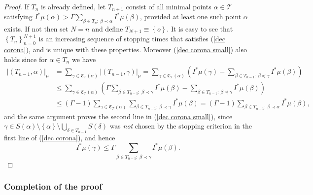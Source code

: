 \documentclass{amsart}%
\theoremstyle{plain}
\numberwithin{equation}{section}
\begin{document}
\begin{proof}
If $T_{n}$ is already defined, let $T_{n+1}$ consist of all minimal points
$\alpha\in\mathcal{T}$ satisfying $I^{\ast}\mu\left(  \alpha\right)
>\Gamma\sum_{\beta\in T_{n}:\ \beta\prec\alpha}I^{\ast}\mu\left(
\beta\right)  $, provided at least one such point $\alpha$ exists. If not then
set $N=n$ and define $T_{N+1}\equiv\left\{  o\right\}  $. It is easy to see
that $\left\{  T_{n}\right\}  _{n=0}^{N+1}$ is an increasing sequence of
stopping times that satisfies (\ref{dec corona}), and is unique with these
properties. Moreover (\ref{dec corona small}) also holds since for $\alpha\in
T_{n}$ we have%
\begin{align*}
\left\vert \left(  T_{n-1},\alpha\right)  \right\vert _{\mu}  & =\sum
_{\gamma\in\mathfrak{C}_{\mathcal{T}}\left(  \alpha\right)  }\left\vert
\left(  T_{n-1},\gamma\right)  \right\vert _{\mu}=\sum_{\gamma\in
\mathfrak{C}_{\mathcal{T}}\left(  \alpha\right)  }\left(  I^{\ast}\mu\left(
\gamma\right)  -\sum_{\beta\in T_{n-1}:\ \beta\preccurlyeq\gamma}I^{\ast}%
\mu\left(  \beta\right)  \right) \\
& \leq\sum_{\gamma\in\mathfrak{C}_{\mathcal{T}}\left(  \alpha\right)  }\left(
\Gamma\sum_{\beta\in T_{n-1}:\ \beta\prec\gamma}I^{\ast}\mu\left(
\beta\right)  -\sum_{\beta\in T_{n-1}:\ \beta\preccurlyeq\gamma}I^{\ast}%
\mu\left(  \beta\right)  \right) \\
& \leq\left(  \Gamma-1\right)  \sum_{\gamma\in\mathfrak{C}_{\mathcal{T}%
}\left(  \alpha\right)  }\sum_{\beta\in T_{n-1}:\ \beta\prec\gamma}I^{\ast}%
\mu\left(  \beta\right)  =\left(  \Gamma-1\right)  \sum_{\beta\in
T_{n-1}:\ \beta\prec\alpha}I^{\ast}\mu\left(  \beta\right)  ,
\end{align*}
and the same argument proves the second line in (\ref{dec corona small}),
since $\gamma\in S\left(  \alpha\right)  \setminus\left\{  \alpha\right\}
\setminus\bigcup_{\delta\in T_{n-1}}S\left(  \delta\right)  $ was \emph{not}
chosen by the stopping criterion in the first line of (\ref{dec corona}), and
hence%
\[
I^{\ast}\mu\left(  \gamma\right)  \leq\Gamma\sum_{\beta\in T_{n-1}%
:\ \beta\prec\gamma}I^{\ast}\mu\left(  \beta\right)  .
\]

\end{proof}

\subsubsection{Completion of the proof}
\end{document}
